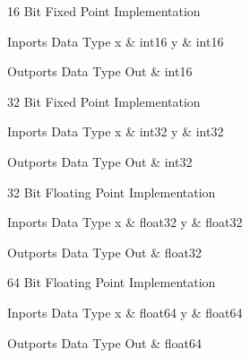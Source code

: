 \nopagebreak[0]

16 Bit Fixed Point Implementation

\begin{XtoCtabular}{Inports Data Type}
x & int16\tabularnewline
\hline
y & int16\tabularnewline
\hline
\end{XtoCtabular}

\begin{XtoCtabular}{Outports Data Type}
Out & int16\tabularnewline
\hline
\end{XtoCtabular}

\ifdefined \AddTestReports
{}
\fi
{}
\nopagebreak[0]

32 Bit Fixed Point Implementation

\begin{XtoCtabular}{Inports Data Type}
x & int32\tabularnewline
\hline
y & int32\tabularnewline
\hline
\end{XtoCtabular}

\begin{XtoCtabular}{Outports Data Type}
Out & int32\tabularnewline
\hline
\end{XtoCtabular}

\ifdefined \AddTestReports
{}
\fi
{}
\nopagebreak[0]

32 Bit Floating Point Implementation

\begin{XtoCtabular}{Inports Data Type}
x & float32\tabularnewline
\hline
y & float32\tabularnewline
\hline
\end{XtoCtabular}

\begin{XtoCtabular}{Outports Data Type}
Out & float32\tabularnewline
\hline
\end{XtoCtabular}

\ifdefined \AddTestReports
{}
\fi
{}
\nopagebreak[0]

64 Bit Floating Point Implementation

\begin{XtoCtabular}{Inports Data Type}
x & float64\tabularnewline
\hline
y & float64\tabularnewline
\hline
\end{XtoCtabular}

\begin{XtoCtabular}{Outports Data Type}
Out & float64\tabularnewline
\hline
\end{XtoCtabular}

\ifdefined \AddTestReports
{}
\fi
